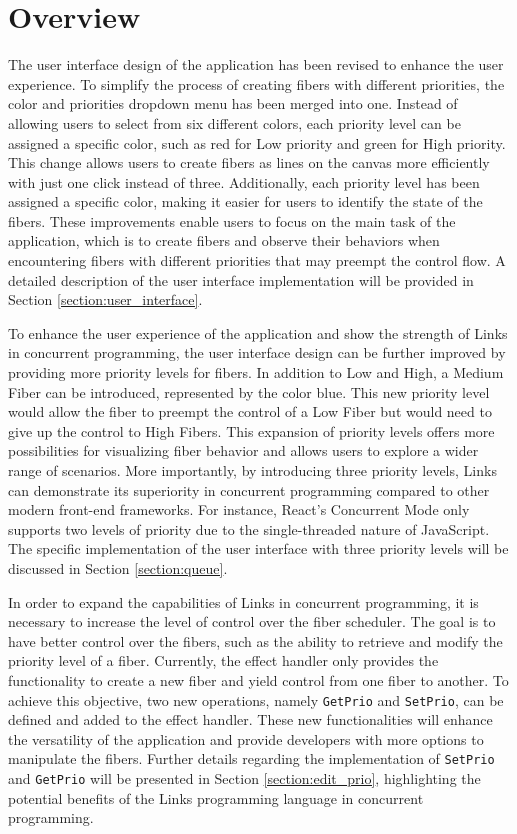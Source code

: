 \documentclass[logo,bsc,singlespacing,parskip]{infthesis}
\begin{document}
\section{Overview}
\label{section:design_overview}

The user interface design of the application has been revised to enhance the user experience. To simplify the process of creating fibers with different priorities, the color and priorities dropdown menu has been merged into one.  Instead of allowing users to select from six different colors, each priority level can be assigned a specific color, such as red for Low priority and green for High priority. This change allows users to create fibers as lines on the canvas more efficiently with just one click instead of three. Additionally, each priority level has been assigned a specific color, making it easier for users to identify the state of the fibers. These improvements enable users to focus on the main task of the application, which is to create fibers and observe their behaviors when encountering fibers with different priorities that may preempt the control flow. A detailed description of the user interface implementation will be provided in Section \ref{section:user_interface}.

To enhance the user experience of the application and show the strength of Links in concurrent programming, the user interface design can be further improved by providing more priority levels for fibers. In addition to Low and High, a Medium Fiber can be introduced, represented by the color blue. This new priority level would allow the fiber to preempt the control of a Low Fiber but would need to give up the control to High Fibers. This expansion of priority levels offers more possibilities for visualizing fiber behavior and allows users to explore a wider range of scenarios. More importantly, by introducing three priority levels, Links can demonstrate its superiority in concurrent programming compared to other modern front-end frameworks. For instance, React's Concurrent Mode \cite{react_concurrent} only supports two levels of priority due to the single-threaded nature of JavaScript. The specific implementation of the user interface with three priority levels will be discussed in Section \ref{section:queue}.

In order to expand the capabilities of Links in concurrent programming, it is necessary to increase the level of control over the fiber scheduler. The goal is to have better control over the fibers, such as the ability to retrieve and modify the priority level of a fiber. Currently, the effect handler only provides the functionality to create a new fiber and yield control from one fiber to another. To achieve this objective, two new operations, namely \texttt{GetPrio} and \texttt{SetPrio}, can be defined and added to the effect handler. These new functionalities will enhance the versatility of the application and provide developers with more options to manipulate the fibers. Further details regarding the implementation of \texttt{SetPrio} and \texttt{GetPrio} will be presented in Section \ref{section:edit_prio}, highlighting the potential benefits of the Links programming language in concurrent programming.
\end{document}
